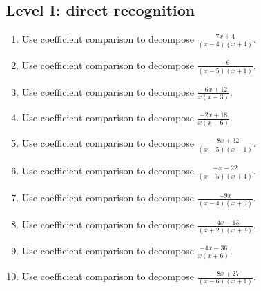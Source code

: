 \documentclass[11pt,oneside]{book}
\begin{document}
\subsection*{Level I: direct recognition}
\begin{enumerate}[leftmargin=*,label=\textbf{\arabic*.},itemsep=0.65\baselineskip]
\item Use coefficient comparison to decompose $\displaystyle \frac{7 x + 4}{\left(x - 4\right) \left(x + 4\right)}$.
\item Use coefficient comparison to decompose $\displaystyle \frac{-6}{\left(x - 5\right) \left(x + 1\right)}$.
\item Use coefficient comparison to decompose $\displaystyle \frac{- 6 x + 12}{x \left(x - 3\right)}$.
\item Use coefficient comparison to decompose $\displaystyle \frac{- 2 x + 18}{x \left(x - 6\right)}$.
\item Use coefficient comparison to decompose $\displaystyle \frac{- 8 x + 32}{\left(x - 5\right) \left(x - 1\right)}$.
\item Use coefficient comparison to decompose $\displaystyle \frac{- x - 22}{\left(x - 5\right) \left(x + 4\right)}$.
\item Use coefficient comparison to decompose $\displaystyle \frac{- 9 x}{\left(x - 4\right) \left(x + 5\right)}$.
\item Use coefficient comparison to decompose $\displaystyle \frac{- 4 x - 13}{\left(x + 2\right) \left(x + 3\right)}$.
\item Use coefficient comparison to decompose $\displaystyle \frac{- 4 x - 36}{x \left(x + 6\right)}$.
\item Use coefficient comparison to decompose $\displaystyle \frac{- 8 x + 27}{\left(x - 6\right) \left(x + 1\right)}$.
\end{enumerate}
\end{document}
